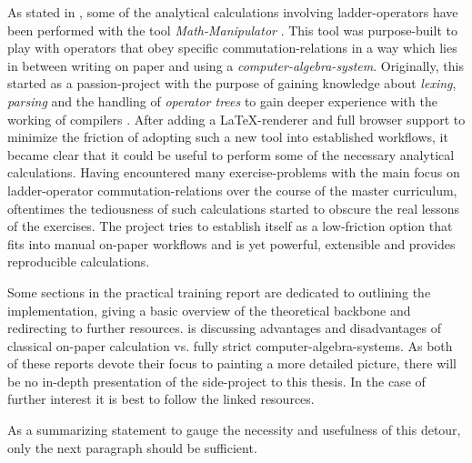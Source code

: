 As stated in , some of the analytical calculations involving ladder-operators have been performed with the tool \emph{Math-Manipulator} \cite{selfMathManipulator}.
This tool was purpose-built to play with operators that obey specific commutation-relations in a way which lies in between writing on paper and using a \emph{computer-algebra-system}.
Originally, this started as a passion-project with the purpose of gaining knowledge about \emph{lexing}, \emph{parsing} and the handling of \emph{operator trees} to gain deeper experience with the working of compilers \cite{compilersDragonBook}.
After adding a \LaTeX-renderer and full browser support to minimize the friction of adopting such a new tool into established workflows, it became clear that it could be useful to perform some of the necessary analytical calculations.
Having encountered many exercise-problems with the main focus on ladder-operator commutation-relations over the course of the master curriculum, oftentimes the tediousness of such calculations started to obscure the real lessons of the exercises.
The project tries to establish itself as a low-friction option that fits into manual \glqq on-paper\grqq{} workflows and is yet powerful, extensible and provides reproducible calculations.

Some sections in the practical training report  are dedicated to outlining the implementation, giving a basic overview of the theoretical backbone and redirecting to further resources.
 is discussing advantages and disadvantages of classical \glqq on-paper\grqq{} calculation vs. fully strict computer-algebra-systems.
As both of these reports devote their focus to painting a more detailed picture, there will be no in-depth presentation of the side-project to this thesis.
In the case of further interest it is best to follow the linked resources.

As a summarizing statement to gauge the necessity and usefulness of this detour, only the next paragraph should be sufficient.

